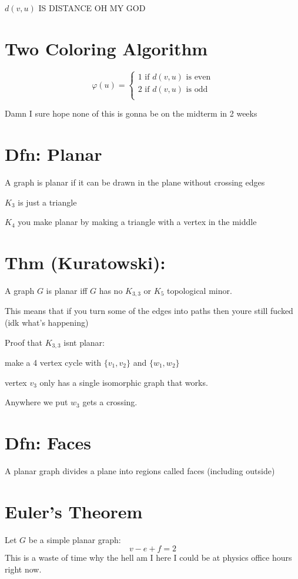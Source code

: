 \documentclass{report}
\begin{document}
$d(v, u)$ IS DISTANCE OH MY GOD
\section{Two Coloring Algorithm}
\[
\varphi(u)
=
\begin{cases}
1 \textrm{ if $d(v, u)$ is even} \\
2 \textrm{ if $d(v, u)$ is odd} \\
\end{cases}
\]

Damn I sure hope none of this is gonna be on the midterm in 2 weeks

\section{Dfn: Planar}
A graph is planar if it can be drawn in the plane without crossing edges

$K_3$ is just a triangle

$K_4$ you make planar by making a triangle with a vertex in the middle 

\section{Thm (Kuratowski):}
A graph $G$ is planar iff $G$ has no $K_{3, 3}$ or $K_5$ topological minor.

This means that if you turn some of the edges into paths then youre still fucked (idk what's happening)

Proof that $K_{3, 3}$ isnt planar:

make a 4 vertex cycle with $\{v_1, v_2 \}$ and $\{ w_1, w_2 \}$

vertex $v_3$ only has a single isomorphic graph that works.

Anywhere we put $w_3$ gets a crossing.

\section{Dfn: Faces}
A planar graph divides a plane into regions called faces (including outside)

\section{Euler's Theorem}
Let $G$ be a simple planar graph:
\[
v - e + f = 2
\]
This is a waste of time why the hell am I here I could be at physics office hours right now.
\end{document}
